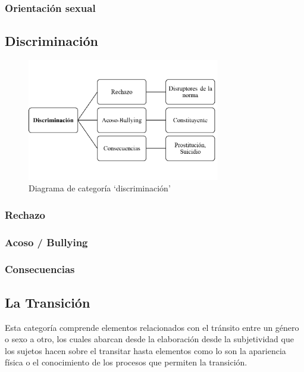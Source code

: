 \subsubsection{Orientación sexual}

\subsection{Discriminación}
\begin{figure}
    \centering
    \includegraphics[width=0.75\textwidth]{discriminacion}
    \caption{Diagrama de categoría ‘discriminación’}\label{fig:discriminacion}
\end{figure}


\subsubsection{Rechazo}

\subsubsection{Acoso / Bullying}

\subsubsection{Consecuencias}

\subsection{La Transición}
Esta categoría comprende elementos relacionados con
el tránsito entre un género o sexo a otro, los cuales abarcan desde la
elaboración desde la subjetividad que los sujetos hacen sobre el transitar hasta
elementos como lo son la apariencia física o el conocimiento de los procesos que
permiten la transición.

